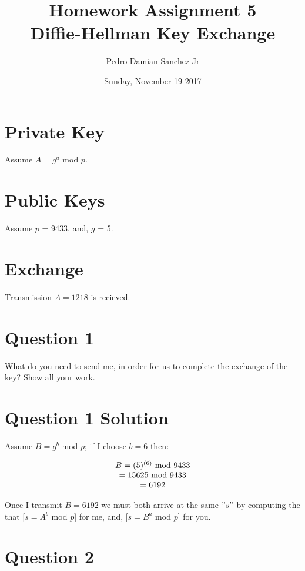 \documentclass[11pt]{article}
\title{\bf Homework Assignment 5\\Diffie-Hellman Key Exchange}
\date{Sunday, November 19 2017}
\author{Pedro Damian Sanchez Jr}
\begin{document}
\maketitle

\section*{Private Key}

Assume $A = g^a$ mod $p$.

\section*{Public Keys}

Assume $p$ = 9433, and, $g$ = 5.

\section*{Exchange}

Transmission $A =1218$ is recieved.

\section*{Question 1}

What do you need to send me, in order for us to complete the exchange of the key? Show all your work.

\section*{Question 1 Solution}

Assume $B = g^b$ mod $p$; if I choose $b = 6$ then:

\begin{displaymath}
\begin{tabular}{c}
$B = (5)^{(6)}$ mod $9433$\\$ = 15625$ mod $9433$\\$ = 6192$\\
\end{tabular}
\end{displaymath}

Once I transmit $B = 6192$ we must both arrive at the same $"s"$ by computing the that [$s = A^b$ mod $p$] for me, and, [$s = B^a$ mod $p$] for you.

\section*{Question 2}
\end{document}
